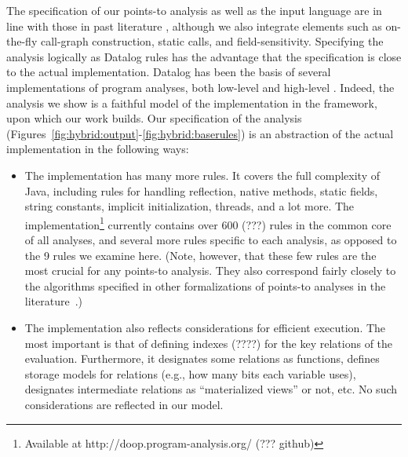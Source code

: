 The specification of our points-to analysis as well as the input language are in line with those in past literature \cite{uss:2009:Guarnieri,fse:2013:Madsen}, although we also integrate elements such as on-the-fly call-graph construction, static calls, and field-sensitivity. Specifying the analysis logically as Datalog rules has the advantage that the specification is close to the actual implementation. Datalog has been the basis of several implementations of program analyses, both low-level \cite{col:1994:Reps,aplas:2005:Whaley,pods:2005:Lam,pldi:2004:Whaley,oopsla:2009:Bravenboer} and high-level \cite{icse:2008:Eichberg,ecoop:2006:Hajiyev}. Indeed, the analysis we show is a faithful model of the implementation in the \doop{} framework, upon which our work builds. Our specification of the analysis (Figures~\ref{fig:hybrid:output}-\ref{fig:hybrid:baserules}) is an abstraction of the actual implementation in the following ways:

\begin{itemize}
\item The implementation has many more rules. It covers the full complexity of Java, including rules for handling reflection, native methods, static fields, string constants, implicit initialization, threads, and a lot more. The \doop{} implementation\footnote{Available at http://doop.program-analysis.org/ (??? github)} currently contains over 600 (???) rules in the common core of all analyses, and several more rules specific to each analysis, as opposed to the 9 rules we examine here. (Note, however, that these few rules are the most crucial for any points-to analysis. They also correspond fairly closely to the algorithms specified in other formalizations of points-to analyses in the literature~\cite{pldi:2010:Might,popl:2011:Smaragdakis}.)

\item The implementation also reflects considerations for efficient execution. The most important is that of defining indexes (????) for the key relations of the evaluation. Furthermore, it designates some relations as functions, defines storage models for relations (e.g., how many bits each variable uses), designates intermediate relations as ``materialized views'' or not, etc. No such considerations are reflected in our model.
\end{itemize}

